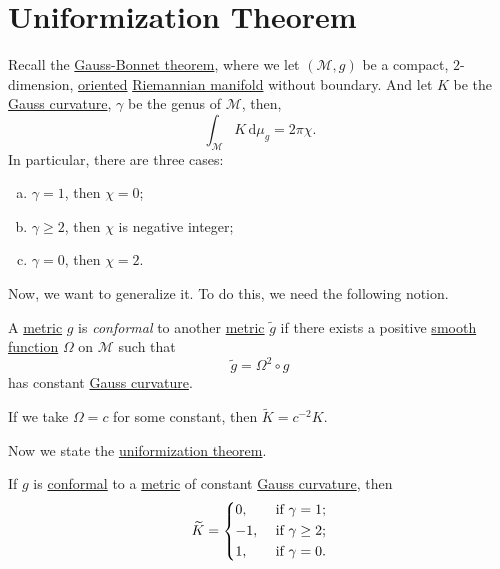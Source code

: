 \section{Uniformization Theorem}
Recall the \hyperref[thm:Gauss-Bonnet]{Gauss-Bonnet theorem}, where we let \((\mathcal{M} , g)\) be a compact, \(2\)-dimension, \hyperref[def:oriented]{oriented} \hyperref[def:Riemannian-manifold]{Riemannian manifold} without boundary. And let \(K\) be the \hyperref[rmk:Gauss-curvature]{Gauss curvature}, \(\gamma \) be the genus of \(\mathcal{M} \), then,
\[
	\int _\mathcal{M} K \,\mathrm{d} \mu _g = 2 \pi \chi .
\]
In particular, there are three cases:
\begin{enumerate}[(a)]
	\item \(\gamma = 1\), then \(\chi = 0\);
	\item \(\gamma \geq 2\), then \(\chi\) is negative integer;
	\item \(\gamma = 0\), then \(\chi = 2\).
\end{enumerate}
Now, we want to generalize it. To do this, we need the following notion.

\begin{definition}[Conformal]\label{def:conformal}
	A \hyperref[def:Riemannian-metric]{metric} \(g\) is \emph{conformal} to another \hyperref[def:Riemannian-metric]{metric} \(\widetilde{g} \) if there exists a positive \hyperref[def:smooth-function]{smooth function} \(\Omega \) on \(\mathcal{M} \) such that
	\[
		\widetilde{g} = \Omega ^2 \circ g
	\]
	has constant \hyperref[rmk:Gauss-curvature]{Gauss curvature}.
\end{definition}

\begin{note}
	If we take \(\Omega = c\) for some constant, then \(\widetilde{K} = c^{-2} K\).
\end{note}

Now we state the \hyperref[thm:uniformization]{uniformization theorem}.

\begin{theorem}\label{thm:uniformization}
	If \(g\) is \hyperref[def:conformal]{conformal} to a \hyperref[def:Riemannian-metric]{metric} of constant \hyperref[rmk:Gauss-curvature]{Gauss curvature}, then
	\[
		\widetilde{K} = \begin{dcases}
			0,  & \text{ if } \gamma = 1 ;    \\
			-1, & \text{ if } \gamma \geq 2 ; \\
			1 , & \text{ if } \gamma = 0.
		\end{dcases}
	\]
\end{theorem}

